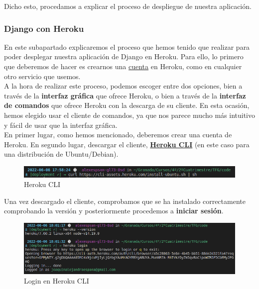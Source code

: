 Dicho esto, procedamos a explicar el proceso de despliegue de nuestra aplicación.

\subsubsection{Django con Heroku}
En este subapartado explicaremos el proceso \cite{heroku-with-django} que hemos tenido que
realizar para poder desplegar nuestra aplicación de Django en Heroku. Para ello, lo primero
que deberemos de hacer es crearnos una \href{https://id.heroku.com/login}{cuenta} en Heroku,
como en cualquier otro servicio que usemos.\\

A la hora de realizar este proceso, podemos escoger entre dos opciones, bien a través de la
\textbf{interfaz gráfica} que ofrece Heroku, o bien a través de la \textbf{interfaz de
comandos} que ofrece Heroku con la descarga de su cliente. En esta ocasión, hemos elegido usar
el cliente de comandos, ya que nos parece mucho más intuitivo y fácil de usar que la interfaz
gráfica.\\

En primer lugar, como hemos mencionado, deberemos crear una cuenta de Heroku. En segundo
lugar, descargar el cliente, \href{https://shorturl.at/emHJY} {\textbf{Heroku CLI}}
(en este caso para una distribución de Ubuntu/Debian).
        
    \begin{figure}[H]
        \centering
        \includegraphics[scale=0.47]{imagenes/heroku-cli.png}
        \caption{Heroku CLI}
        \label{fig:heroku-cli}
    \end{figure}

Una vez descargado el cliente, comprobamos que se ha instalado correctamente comprobando
la versión y posteriormente procedemos a \textbf{iniciar sesión}.

    \begin{figure}[H]
        \centering
        \includegraphics[scale=0.42]{imagenes/heroku-version-login.png}
        \caption{Login en Heroku CLI}
        \label{fig:heroku-version-login}
    \end{figure}

